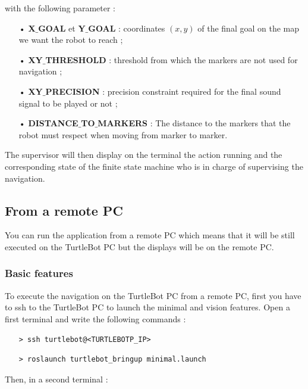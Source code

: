 \documentclass[10pt,a4paper]{article}
\begin{document}
\noindent with the following parameter : 

\begin{itemize}
\item[•] \textbf{X$\_$GOAL} et \textbf{Y$\_$GOAL} : coordinates $(x,y)$ of the final goal on the map we want the robot to reach ; 
\item[•] \textbf{XY$\_$THRESHOLD} : threshold from which the markers are not used for navigation ; 
\item[•] \textbf{XY$\_$PRECISION} : precision constraint required for the final sound signal to be played or not ; 
\item[•] \textbf{DISTANCE$\_$TO$\_$MARKERS} : The distance to the markers that the robot must respect when moving from marker to marker.
\end{itemize}

The supervisor will then display on the terminal the action running and the corresponding state of the finite state machine who is in charge of supervising the navigation.

\subsection{From a remote PC}

You can run the application from a remote PC which means that it will be still executed on the TurtleBot PC but the displays will be on the remote PC.

\subsubsection{Basic features}

To execute the navigation on the TurtleBot PC from a remote PC, first you have to ssh to the TurtleBot PC to launch the minimal and vision features. Open a first terminal and write the following commands :

\begin{itemize}
\item[]  \begin{verbatim}> ssh turtlebot@<TURTLEBOTP_IP> \end{verbatim}
\item[]  \begin{verbatim}> roslaunch turtlebot_bringup minimal.launch \end{verbatim}
\end{itemize}

Then, in a second terminal :
\end{document}
